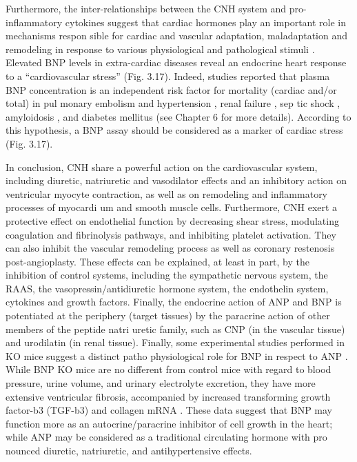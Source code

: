 \documentclass[14pt,a4paper,onecolumn]{extarticle}
\begin{document}
Furthermore, the inter-relationships between the CNH system and pro-inflammatory cytokines suggest that cardiac hormones play an important role in mechanisms respon sible for cardiac and vascular adaptation, maladaptation and remodeling in response to various physiological and pathological stimuli \citep{32} \citep{35} \citep{62} \citep{162}.  Elevated BNP levels in extra-cardiac diseases reveal an endocrine heart response to a “cardiovascular stress” (Fig. 3.17). Indeed,  studies reported that plasma BNP concentration is an independent risk factor for mortality (cardiac and/or total) in pul monary embolism \citep{121} \citep{123} \citep{124} and hypertension \citep{127}, renal failure \citep{28} \citep{100} \citep{144}, sep tic shock \citep{145}, amyloidosis \citep{149}, and diabetes mellitus \citep{141} (see Chapter 6 for more details). According to this hypothesis, a BNP assay should be considered as a marker of cardiac stress (Fig. 3.17).

In conclusion, CNH share a powerful action on the cardiovascular system, including diuretic, natriuretic and vasodilator effects and an inhibitory action on ventricular myocyte contraction, as well as on remodeling and inflammatory processes of myocardi um and smooth muscle cells. Furthermore, CNH exert a protective effect on endothelial function by decreasing shear stress, modulating coagulation and fibrinolysis pathways, and inhibiting platelet activation. They can also inhibit the vascular remodeling process as well as coronary restenosis post-angioplasty. These effects can be explained, at least in part, by the inhibition of control systems, including the sympathetic nervous system, the RAAS, the vasopressin/antidiuretic hormone system, the endothelin system, cytokines and growth factors. Finally, the endocrine action of ANP and BNP is potentiated at the periphery (target tissues) by the paracrine action of other members of the peptide natri uretic family, such as CNP (in the vascular tissue) and urodilatin (in renal tissue).  Finally, some experimental studies performed in KO mice suggest a distinct patho physiological role for BNP in respect to ANP \citep{18}. While BNP KO mice are no different from control mice with regard to blood pressure, urine volume, and urinary electrolyte excretion, they have more extensive ventricular fibrosis, accompanied by increased transforming growth factor-b3 (TGF-b3) and collagen mRNA \citep{18}. These data suggest that BNP may function more as an autocrine/paracrine inhibitor of cell growth in the heart; while ANP may be considered as a traditional circulating hormone with pro nounced diuretic, natriuretic, and antihypertensive effects.
\end{document}
